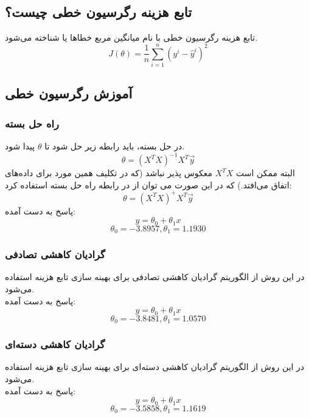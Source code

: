\documentclass{article}
\begin{document}
	\subsection{تابع هزینه رگرسیون خطی چیست؟}
	تابع هزینه رگرسیون خطی با نام میانگین مربع خطاها یا 
	شناخته می‌شود.
	\[J(\theta) = \frac{1}{n}\sum_{i = 1}^n (y^i - \hat{y}^i)^2\]
		
	\subsection{آموزش رگرسیون خطی}
	\subsubsection{راه حل بسته}
	در حل بسته، باید رابطه زیر حل شود تا $\theta$ پیدا شود.
	$$\theta = (X^TX)^{-1}X^T\vec{y}$$
	البته ممکن است
	$X^TX$
	معکوس پذیر نباشد (که در تکلیف همین مورد برای داده‌های  اتفاق می‌افتد.) که در این صورت می توان از 
	در رابطه راه حل بسته استفاده کرد:
	$$\theta = (X^TX)^{+}X^T\vec{y}$$
	پاسخ به دست آمده:
	$$
	y = \theta_0 + \theta_1x
	$$
	$$
	\theta_0 = -3.8957 , \theta_1 = 1.1930
	$$
	\newpage
	\subsubsection{گرادیان کاهشی تصادفی}
	در این روش از الگوریتم گرادیان کاهشی تصادفی برای بهینه سازی تابع هزینه استفاده می‌شود.\\
	پاسخ به دست آمده:
	$$
	y = \theta_0 + \theta_1x
	$$
	$$
	\theta_0 = -3.8481, \theta_1 = 1.0570
	$$
	\subsubsection{گرادیان کاهشی دسته‌ای}
	در این روش از الگوریتم گرادیان کاهشی دسته‌ای برای بهینه سازی تابع هزینه استفاده می‌شود.\\
	پاسخ به دست آمده:
	$$
	y = \theta_0 + \theta_1x
	$$
	$$
	\theta_0 = -3.5858, \theta_1 = 1.1619
	$$
\end{document}
